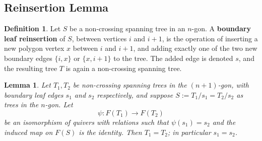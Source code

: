 \documentclass[12pt]{amsart}
\newtheorem{lem}[thm]{Lemma}
\theoremstyle{definition}
\newtheorem{defn}[thm]{Definition}
\theoremstyle{remark}
\numberwithin{equation}{section}
\begin{document}
\subsection{Reinsertion Lemma}

\begin{defn}
Let \(S\) be a non-crossing spanning tree in an \(n\)-gon. A \textbf{boundary leaf reinsertion} of \(S\), between vertices $i$ and $i+1$, is the operation of inserting a new polygon vertex \(x\) between \(i\) and \(i+1\), and adding exactly one of the two new boundary edges \(\{i,x\}\) or \(\{x,i+1\}\) to the tree. The added edge is denoted \(s\), and the resulting tree \(T\) is again a non-crossing spanning tree.
\label{defn: reinsertion}
\end{defn}

\begin{lem}\label{lem:reinsertion-unique}
Let \(T_1, T_2\) be non-crossing spanning trees in the \((n+1)\)-gon, with boundary leaf edges \(s_1\) and \(s_2\) respectively, and suppose \(S := T_1/s_1 = T_2/s_2\) as trees in the \(n\)-gon. Let
\[
\psi: F(T_1) \to F(T_2)
\]
be an isomorphism of quivers with relations such that \(\psi(s_1) = s_2\) and the induced map on \(F(S)\) is the identity. Then \(T_1 = T_2\); in particular \(s_1 = s_2\).
\end{lem}
\end{document}
